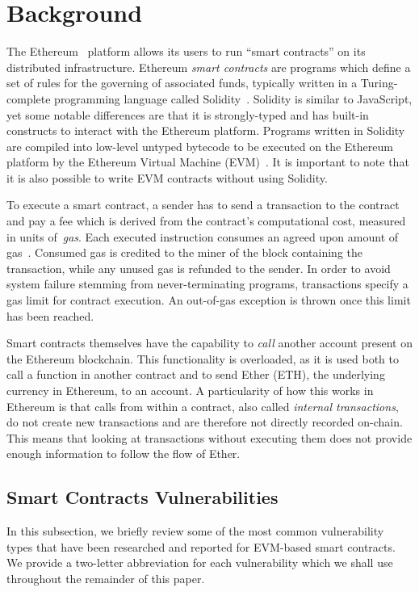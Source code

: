 \section{Background}
\label{sec:background} 
The Ethereum~\cite{Buterin2014} platform allows its users to run ``smart contracts'' on its distributed infrastructure. Ethereum \emph{smart contracts} are programs which define a set of rules for the governing of associated funds, typically written in a Turing-complete programming language called Solidity~\cite{Dannen:2017:IES:3103305}. Solidity is similar to JavaScript, yet some notable differences are that it is strongly-typed and has built-in constructs to interact with the Ethereum platform. Programs written in Solidity are compiled into low-level untyped bytecode to be executed on the Ethereum platform by the Ethereum Virtual Machine (EVM)~\cite{wood2014ethereum}. It is important to note that it is also possible to write EVM contracts without using Solidity.

To execute a smart contract, a sender has to send a transaction to the contract and pay a fee which is derived from the contract's computational cost, measured in units of~\emph{gas}. Each executed instruction consumes an agreed upon amount of gas~\cite{wood2014ethereum}. Consumed gas is credited to the miner of the block containing the transaction, while any unused gas is refunded to the sender. In order to avoid system failure stemming from never-terminating programs, transactions specify a gas limit for contract execution. An out-of-gas exception is thrown once this limit has been reached.

Smart contracts themselves have the capability to \emph{call} another account present on the Ethereum blockchain. This functionality is overloaded, as it is used both to call a function in another contract and to send Ether (ETH), the underlying currency in Ethereum, to an account. A particularity of how this works in Ethereum is that calls from within a contract, also called \emph{internal transactions}, do not create new transactions and are therefore not directly recorded on-chain. This means that looking at transactions without executing them does not provide enough information to follow the flow of Ether.

\subsection{Smart Contracts Vulnerabilities}
\label{ssec:vulnerability-types}
In this subsection, we briefly review some of the most common vulnerability types that have been researched and reported for EVM-based smart contracts. We provide a two-letter abbreviation for each vulnerability which we shall use throughout the remainder of this paper.

